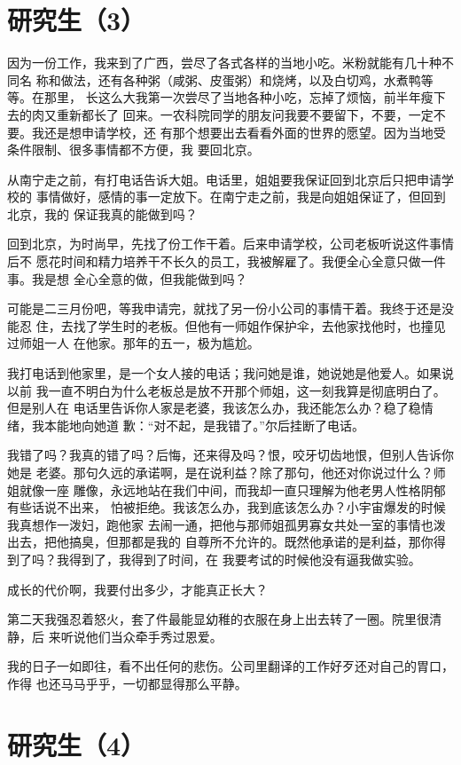 \documentclass[12pt]{book}
\begin{document}
\section{研究生（3）}
\label{sec-5-3}

因为一份工作，我来到了广西，尝尽了各式各样的当地小吃。米粉就能有几十种不同名
称和做法，还有各种粥（咸粥、皮蛋粥）和烧烤，以及白切鸡，水煮鸭等等。在那里，
长这么大我第一次尝尽了当地各种小吃，忘掉了烦恼，前半年瘦下去的肉又重新都长了
回来。一农科院同学的朋友问我要不要留下，不要，一定不要。我还是想申请学校，还
有那个想要出去看看外面的世界的愿望。因为当地受条件限制、很多事情都不方便，我
要回北京。

从南宁走之前，有打电话告诉大姐。电话里，姐姐要我保证回到北京后只把申请学校的
事情做好，感情的事一定放下。在南宁走之前，我是向姐姐保证了，但回到北京，我的
保证我真的能做到吗？

回到北京，为时尚早，先找了份工作干着。后来申请学校，公司老板听说这件事情后不
愿花时间和精力培养干不长久的员工，我被解雇了。我便全心全意只做一件事。我是想
全心全意的做，但我能做到吗？

可能是二三月份吧，等我申请完，就找了另一份小公司的事情干着。我终于还是没能忍
住，去找了学生时的老板。但他有一师姐作保护伞，去他家找他时，也撞见过师姐一人
在他家。那年的五一，极为尴尬。

我打电话到他家里，是一个女人接的电话；我问她是谁，她说她是他爱人。如果说以前
我一直不明白为什么老板总是放不开那个师姐，这一刻我算是彻底明白了。但是别人在
电话里告诉你人家是老婆，我该怎么办，我还能怎么办？稳了稳情绪，我本能地向她道
歉：“对不起，是我错了。”尔后挂断了电话。

我错了吗？我真的错了吗？后悔，还来得及吗？恨，咬牙切齿地恨，但别人告诉你她是
老婆。那句久远的承诺啊，是在说利益？除了那句，他还对你说过什么？师姐就像一座
雕像，永远地站在我们中间，而我却一直只理解为他老男人性格阴郁有些话说不出来，
怕被拒绝。我该怎么办，我到底该怎么办？小宇宙爆发的时候我真想作一泼妇，跑他家
去闹一通，把他与那师姐孤男寡女共处一室的事情也泼出去，把他搞臭，但那都是我的
自尊所不允许的。既然他承诺的是利益，那你得到了吗？我得到了，我得到了时间，在
我要考试的时候他没有逼我做实验。

成长的代价啊，我要付出多少，才能真正长大？

第二天我强忍着怒火，套了件最能显幼稚的衣服在身上出去转了一圈。院里很清静，后
来听说他们当众牵手秀过恩爱。

我的日子一如即往，看不出任何的悲伤。公司里翻译的工作好歹还对自己的胃口，作得
也还马马乎乎，一切都显得那么平静。
\section{研究生（4）}
\label{sec-5-4}
\end{document}
